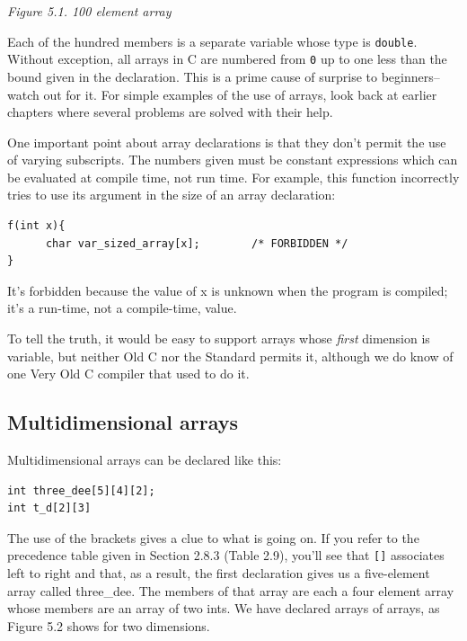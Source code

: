 \begin{center}\textit{Figure 5.1. 100 element array}\end{center}


  Each of the hundred members is a separate variable whose type is
   \texttt{double}. Without exception, all arrays in C are numbered from
   \texttt{0} up to one less than the bound given in the declaration.
   This is a prime cause of surprise to beginners--watch out for it. For
   simple examples of the use of arrays, look back at earlier chapters where
   several problems are solved with their help.


  One important point about array declarations is that they don't permit
   the use of varying subscripts. The numbers given must be constant
   expressions which can be evaluated at compile time, not run time. For
   example, this function incorrectly tries to use its argument in the size
   of an array declaration:


  \begin{Verbatim}
f(int x){
      char var_sized_array[x];        /* FORBIDDEN */
}
\end{Verbatim}

  It's forbidden because the value of x is unknown when the program is
   compiled; it's a run-time, not a compile-time, value.


  To tell the truth, it would be easy to support arrays whose
   \textit{first} dimension is variable, but neither Old C nor the Standard
   permits it, although we do know of one Very Old C compiler that used to
   do it.


  \subsection{Multidimensional arrays}
   

   Multidimensional arrays can be declared like this:


   \begin{Verbatim}
int three_dee[5][4][2];
int t_d[2][3]
\end{Verbatim}

   The use of the brackets gives a clue to what is going on. If you refer
    to the precedence table given in Section 2.8.3 (Table 2.9), you'll see that \texttt{[]} associates left to
    right and that, as a result, the first declaration gives us
    a five-element array called three\_dee. The members of that array are
    each a four element array whose members are an array of two ints. We
    have declared arrays of arrays, as Figure 5.2 shows for two
    dimensions.


